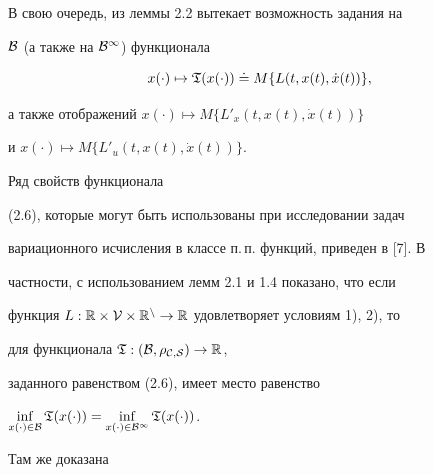 В свою очередь, из леммы 2.2 вытекает возможность задания на


$\cal B$ (а также на $\cal B^1$) функционала


\begin{equation}


x(\cdot)\mapsto\frak T(x(\cdot))\doteq M\{L(t,x(t),\Dot x(t))\},


\end{equation}


а также отображений $x(\cdot)\mapsto M\{L'_x(t,x(t),\Dot x(t))\}$


и $x(\cdot)\mapsto M\{L'_u(t,x(t),\Dot x(t))\}$.








\begin{notes}


Ряд свойств функционала


(2.6), которые могут быть использованы при исследовании задач


вариационного исчисления в классе п.\,п. функций, приведен в [7]. В


частности, с использованием лемм 2.1 и 1.4 показано, что если


функция $L:\Bbb R\times\cal V\times\Bbb


R^n\to\Bbb R$ удовлетворяет условиям 1), 2), то


для функционала $\frak T:(\cal B,\rho_{C,S})\to\Bbb R$, 


заданного равенством (2.6), имеет место равенство


$\inf\limits_{x(\cdot)\in\cal B}\frak T(x(\cdot))=


\inf\limits_{x(\cdot)\in\cal B^1}\frak T(x(\cdot))$.


Там же доказана


\end{notes}





